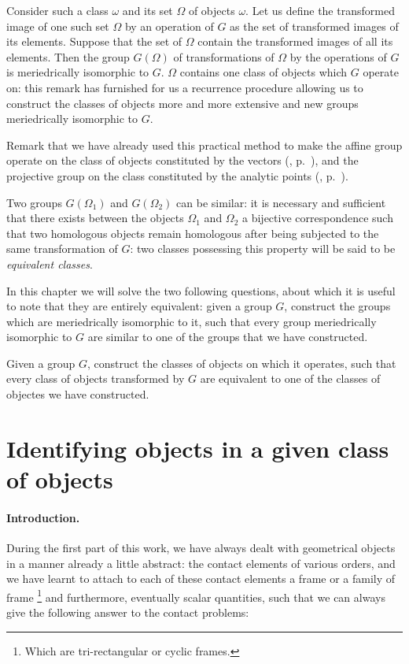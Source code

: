 Consider such a class $\omega$ and its set $\Omega$ of objects $\omega$. Let us define the transformed image of one such set $\Omega$ by an operation of $G$ as the set of transformed images of its elements. Suppose that the set of $\Omega$ contain the transformed images of all its elements. Then the group $G(\Omega)$ of transformations of $\Omega$ by the operations of $G$ is meriedrically isomorphic to $G$. $\Omega$ contains one class of objects which $G$ operate on: this remark has furnished for us a recurrence procedure allowing us to construct the classes of objects more and more extensive and new groups meriedrically isomorphic to $G$.

\somespace

{\small
Remark that we have already used this practical method to make the affine group operate on the class of objects constituted by the vectors (, p.~\pageref{sec:65}), and the projective group on the class constituted by the analytic points (, p.~\pageref{sec:67}).
}

\somespace

Two groups $G(\Omega_{1})$ and $G(\Omega_{2})$ can be similar: it is necessary and sufficient that there exists between the objects $\Omega_{1}$ and $\Omega_{2}$ a bijective correspondence such that two homologous objects remain homologous after being subjected to the same transformation of $G$: two classes possessing this property will be said to be \emph{equivalent classes}.

In this chapter we will solve the two following questions, about which it is useful to note that they are entirely equivalent: given a group $G$, construct the groups which are meriedrically isomorphic to it, such that every group meriedrically isomorphic to $G$ are similar to one of the groups that we have constructed.

Given a group $G$, construct the classes of objects on which it operates, such that every class of objects transformed by $G$ are equivalent to one of the classes of objectes we have constructed.


\section{Identifying objects in a given class of objects}
\label{sec:spott-objects-same}

\paragraph{Introduction.}
\label{sec:92}
During the first part of this work, we have always dealt with geometrical objects in a manner already a little abstract: the contact elements of various orders, and we have learnt to attach to each of these contact elements a frame or a family of frame \footnote{Which are tri-rectangular or cyclic frames.} and furthermore, eventually scalar quantities, such that we can always give the following answer to the contact problems:

